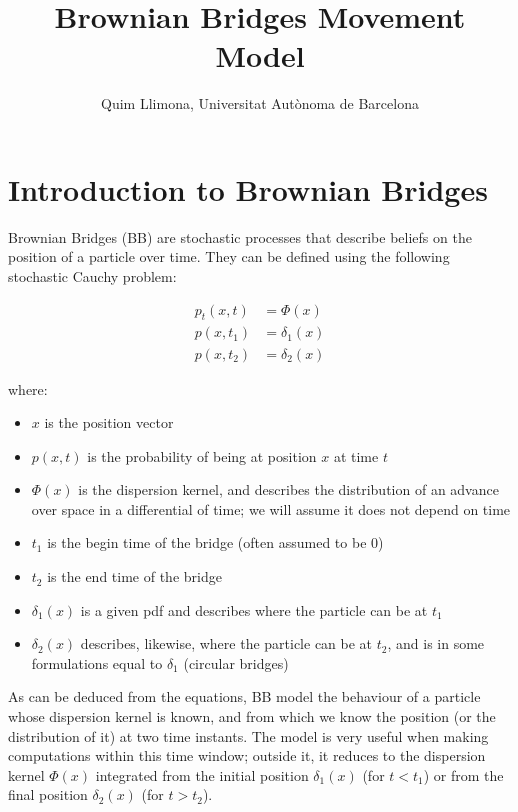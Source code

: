 \documentclass[12pt]{article}
\title{Brownian Bridges Movement Model}
\author{Quim Llimona, Universitat Autònoma de Barcelona}
\date{}
\begin{document}
\maketitle

\tableofcontents
\clearpage

\section{Introduction to Brownian Bridges}

Brownian Bridges (BB) are stochastic processes that describe beliefs on the position of a particle over time. They can be defined using the following stochastic Cauchy problem:

\begin{align*}
    p_t(x,t) &= \Phi(x) \\        %
    p(x,t_1) &= \delta_1(x) \\
    p(x,t_2) &= \delta_2(x)
\end{align*}

where:

\begin{itemize}
    \item $x$ is the position vector
    \item $p(x,t)$ is the probability of being at position $x$ at time $t$
    \item $\Phi(x)$ is the dispersion kernel, and describes the distribution of an advance over space in a differential of time; we will assume it does not depend on time
    \item $t_1$ is the begin time of the bridge (often assumed to be 0)
    \item $t_2$ is the end time of the bridge
    \item $\delta_1(x)$ is a given pdf and describes where the particle can be at $t_1$
    \item $\delta_2(x)$ describes, likewise, where the particle can be at $t_2$, and is in some formulations equal to $\delta_1$ (circular bridges)
\end{itemize}

As can be deduced from the equations, BB model the behaviour of a particle whose dispersion kernel is known, and from which we know the position (or the distribution of it) at two time instants. The model is very useful when making computations within this time window; outside it, it reduces to the dispersion kernel $\Phi(x)$ integrated from the initial position $\delta_1(x)$ (for $t < t_1$) or from the final position $\delta_2(x)$ (for $t > t_2$).
\end{document}
